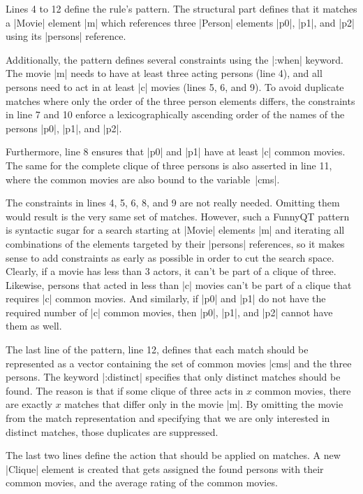 \documentclass[submission]{eptcs}
\newcommand{\code}{\clojureinline}
\begin{document}
Lines 4 to 12 define the rule's pattern.  The structural part defines that it
matches a \code|Movie| element \code|m| which references three \code|Person|
elements \code|p0|, \code|p1|, and \code|p2| using its \code|persons|
reference.

Additionally, the pattern defines several constraints using the \code|:when|
keyword.  The movie \code|m| needs to have at least three acting persons (line
4), and all persons need to act in at least \code|c| movies (lines 5, 6, and
9).  To avoid duplicate matches where only the order of the three person
elements differs, the constraints in line 7 and 10 enforce a lexicographically
ascending order of the names of the persons \code|p0|, \code|p1|, and
\code|p2|.

Furthermore, line 8 ensures that \code|p0| and \code|p1| have at least \code|c|
common movies.  The same for the complete clique of three persons is also
asserted in line 11, where the common movies are also bound to the
variable~\code|cms|.

The constraints in lines 4, 5, 6, 8, and 9 are not really needed.  Omitting
them would result is the very same set of matches.  However, such a FunnyQT
pattern is syntactic sugar for a search starting at \code|Movie| elements
\code|m| and iterating all combinations of the elements targeted by their
\code|persons| references, so it makes sense to add constraints as early as
possible in order to cut the search space.  Clearly, if a movie has less than 3
actors, it can't be part of a clique of three.  Likewise, persons that acted in
less than \code|c| movies can't be part of a clique that requires \code|c|
common movies.  And similarly, if \code|p0| and \code|p1| do not have the
required number of \code|c| common movies, then \code|p0|, \code|p1|, and
\code|p2| cannot have them as well.

The last line of the pattern, line 12, defines that each match should be
represented as a vector containing the set of common movies \code|cms| and the
three persons.  The keyword \code|:distinct| specifies that only distinct
matches should be found.  The reason is that if some clique of three acts in
\(x\)
common movies, there are exactly \(x\)
matches that differ only in the movie \code|m|.  By omitting the movie from the
match representation and specifying that we are only interested in distinct
matches, those duplicates are suppressed.

The last two lines define the action that should be applied on matches.  A new
\code|Clique| element is created that gets assigned the found persons with
their common movies, and the average rating of the common movies.
\end{document}

